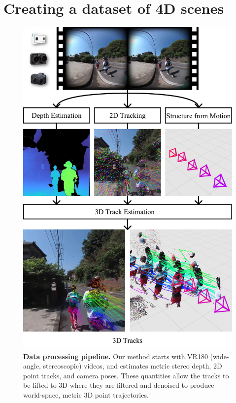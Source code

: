 
\section{Creating a dataset of 4D scenes}
\label{sec:data}


\begin{figure}
    \centering
    \includegraphics[width=\linewidth]{fig/data_processing_vertical.pdf}
    \vspace{-2em}
    \caption{\textbf{Data processing pipeline.} Our method starts with VR180 (wide-angle, stereoscopic) videos, and estimates metric stereo depth, 2D point tracks, and camera poses. These quantities allow the tracks to be lifted to 3D where they are filtered and denoised to produce world-space, metric 3D point trajectories.}
    \label{fig:data_pipeline}
\end{figure}

